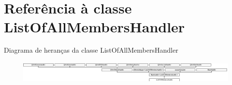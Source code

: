 \hypertarget{class_list_of_all_members_handler}{\section{Referência à classe List\-Of\-All\-Members\-Handler}
\label{class_list_of_all_members_handler}
}
Diagrama de heranças da classe List\-Of\-All\-Members\-Handler\begin{figure}[H]
\begin{center}
\leavevmode
\includegraphics[height=1.155235cm]{class_list_of_all_members_handler}
\end{center}
\end{figure}
